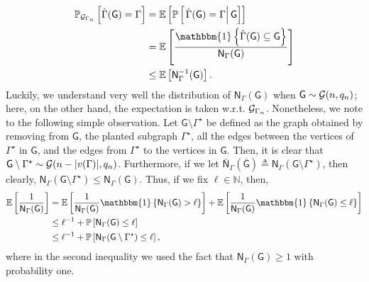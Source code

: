 \documentclass[12pt]{article}
\newcommand{\bE}{\mathbb{E}}
\newcommand{\Ind}{\mathbbm{1}}
\newcommand {\pr} {\mathbb{P}}
\newcommand{\calG}{{\cal G}}
\newcommand{\pp}[1]{\left[#1\right]}
\newcommand{\ppp}[1]{\left\{#1\right\}}
\newcommand{\s}[1]{\mathsf{#1}}
\begin{document}
\begin{align}
    \pr_{\calG_{\Gamma_n}}\pp{\hat{\Gamma}(\s{G})=\Gamma} &= \bE\pp{\pr\pp{\left.\hat{\Gamma}(\s{G})=\Gamma\right|\s{G}}}\\
    & = \bE\pp{\frac{\Ind\ppp{\hat{\Gamma}(\s{G})\subseteq \s{G}}}{\s{N}_{\Gamma}(\s{G})}}\\
    &\leq \bE\pp{\s{N}^{-1}_{\Gamma}(\s{G})}.\label{eqn:recCount}
\end{align}
Luckily, we understand very well the distribution of $\s{N}_{\Gamma}(\s{G})$ when $\s{G}\sim\calG(n,q_n)$; here, on the other hand, the expectation is taken w.r.t. $\calG_{\Gamma_n}$. Nonetheless, we note to the following simple observation. Let $\s{G}\setminus\Gamma^\star$ be defined as the graph obtained by removing from $\s{G}$, the planted subgraph $\Gamma^\star$, all the edges between the vertices of $\Gamma^\star$ in $\s{G}$, and the edges from $\Gamma^\star$ to the vertices in $\s{G}$. Then, it is clear that $\s{G}\setminus\Gamma^\star\sim\calG(n-|v(\Gamma)|,q_n)$. Furthermore, if we let $\bar{\s{N}}_{\Gamma}(\bar{\s{G}})\triangleq\s{N}_{\Gamma}(\s{G}\setminus\Gamma^\star)$, then clearly, $\s{N}_{\Gamma}(\s{G}\setminus\Gamma^\star)\leq\s{N}_{\Gamma}(\s{G})$. Thus, if we fix $\ell\in\mathbb{N}$, then,
\begin{align}
    \bE\pp{\frac{1}{\s{N}_{\Gamma}(\s{G})}}& = \bE\pp{\frac{1}{\s{N}_{\Gamma}(\s{G})}\Ind\ppp{\s{N}_{\Gamma}(\s{G})>\ell}}+\bE\pp{\frac{1}{\s{N}_{\Gamma}(\s{G})}\Ind\ppp{\s{N}_{\Gamma}(\s{G})\leq\ell}}\\
    &\leq \ell^{-1}+\pr\pp{\s{N}_{\Gamma}(\s{G})\leq\ell}\\
    &\leq \ell^{-1}+\pr\pp{\s{N}_{\Gamma}(\s{G}\setminus\Gamma^\star)\leq\ell},\label{eqn:ExactRecov}
\end{align}
where in the second inequality we used the fact that $\s{N}_{\Gamma}(\s{G}) \geq1$ with probability one. 
\end{document}
